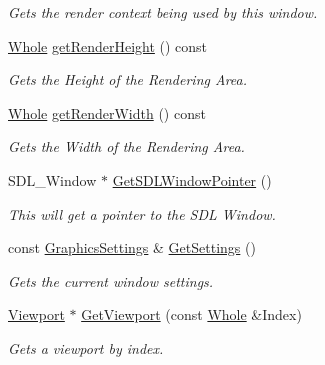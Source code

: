 \begin{DoxyCompactItemize}
\begin{DoxyCompactList}\small\item\em Gets the render context being used by this window. \item\end{DoxyCompactList}\item 
\hyperlink{namespacephys_a460f6bc24c8dd347b05e0366ae34f34a}{Whole} \hyperlink{classphys_1_1GameWindow_a9c4d207a8889453ac5f35e7925fd13ef}{getRenderHeight} () const 
\begin{DoxyCompactList}\small\item\em Gets the Height of the Rendering Area. \item\end{DoxyCompactList}\item 
\hyperlink{namespacephys_a460f6bc24c8dd347b05e0366ae34f34a}{Whole} \hyperlink{classphys_1_1GameWindow_a77e2ec6f64b7a7d1229aca32de57c872}{getRenderWidth} () const 
\begin{DoxyCompactList}\small\item\em Gets the Width of the Rendering Area. \item\end{DoxyCompactList}\item 
SDL\_\-Window $\ast$ \hyperlink{classphys_1_1GameWindow_aefddde0d6790e9e71687310b0328b043}{GetSDLWindowPointer} ()
\begin{DoxyCompactList}\small\item\em This will get a pointer to the SDL Window. \item\end{DoxyCompactList}\item 
const \hyperlink{structphys_1_1GraphicsSettings}{GraphicsSettings} \& \hyperlink{classphys_1_1GameWindow_a9f74d3e37c8ad83727c050175927bdc1}{GetSettings} ()
\begin{DoxyCompactList}\small\item\em Gets the current window settings. \item\end{DoxyCompactList}\item 
\hyperlink{classphys_1_1Viewport}{Viewport} $\ast$ \hyperlink{classphys_1_1GameWindow_a048bdd313420da1902bdc5226d14ae47}{GetViewport} (const \hyperlink{namespacephys_a460f6bc24c8dd347b05e0366ae34f34a}{Whole} \&Index)
\begin{DoxyCompactList}\small\item\em Gets a viewport by index. \item\end{DoxyCompactList}\item 

\end{DoxyCompactItemize}
